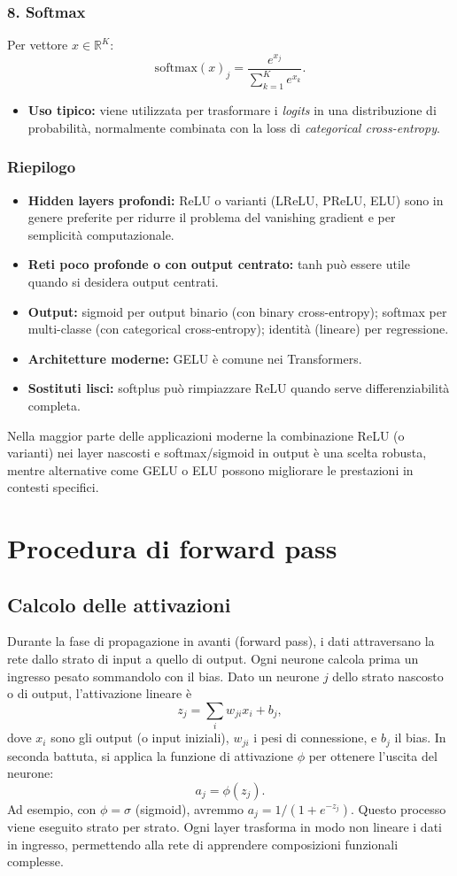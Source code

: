 \documentclass[a4paper,12pt]{report}
\begin{document}
	\subsubsection{8. Softmax}
	Per vettore $x\in\mathbb{R}^K$:
	\[
	\mathrm{softmax}(x)_j=\frac{e^{x_j}}{\sum_{k=1}^K e^{x_k}}.
	\]
	\begin{itemize}
		\item \textbf{Uso tipico:} viene utilizzata per trasformare i \emph{logits} in una distribuzione di probabilità, normalmente combinata con la loss di \emph{categorical cross-entropy}.
	\end{itemize}
	
	\subsubsection{Riepilogo}
	\begin{itemize}
		\item \textbf{Hidden layers profondi:} ReLU o varianti (LReLU, PReLU, ELU) sono in genere preferite per ridurre il problema del vanishing gradient e per semplicità computazionale.
		\item \textbf{Reti poco profonde o con output centrato:} tanh può essere utile quando si desidera output centrati.
		\item \textbf{Output:} sigmoid per output binario (con binary cross-entropy); softmax per multi-classe (con categorical cross-entropy); identità (lineare) per regressione.
		\item \textbf{Architetture moderne:} GELU è comune nei Transformers.
		\item \textbf{Sostituti lisci:} softplus può rimpiazzare ReLU quando serve differenziabilità completa.
	\end{itemize}
	Nella maggior parte delle applicazioni moderne la combinazione ReLU (o varianti) nei layer nascosti e softmax/sigmoid in output è una scelta robusta, mentre alternative come GELU o ELU possono migliorare le prestazioni in contesti specifici.
	
	\section{Procedura di forward pass}
	
	\subsection{Calcolo delle attivazioni}
	Durante la fase di propagazione in avanti (forward pass), i dati attraversano la rete dallo strato di input a quello di output. Ogni neurone calcola prima un ingresso pesato sommandolo con il bias. Dato un neurone $j$ dello strato nascosto o di output, l’attivazione lineare è
	\[
	z_j = \sum_i w_{ji} x_i + b_j,
	\]
	dove $x_i$ sono gli output (o input iniziali), $w_{ji}$ i pesi di connessione, e $b_j$ il bias. In seconda battuta, si applica la funzione di attivazione $\phi$ per ottenere l'uscita del neurone:
	\[
	a_j = \phi(z_j).
	\]
	Ad esempio, con $\phi=\sigma$ (sigmoid), avremmo $a_j=1/(1+e^{-z_j})$. Questo processo viene eseguito strato per strato. Ogni layer trasforma in modo non lineare i dati in ingresso, permettendo alla rete di apprendere composizioni funzionali complesse.
	
\end{document}
